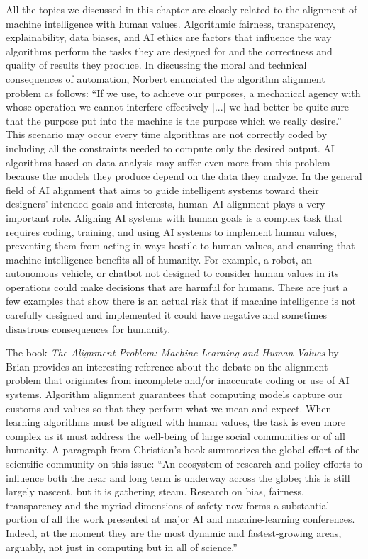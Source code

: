 All the
topics we discussed in this chapter are closely related to the alignment of machine intelligence with human values. Algorithmic fairness, transparency, explainability, data biases, and AI ethics are factors that influence the way algorithms perform the tasks they are designed for and the correctness and quality of results they produce. In discussing the moral and technical consequences of automation, Norbert \citet{chap:7:Wiener:1960} enunciated the algorithm alignment problem as follows: ``If we use, to achieve our purposes, a mechanical agency with whose operation we cannot interfere effectively [...] we had better be quite sure that the purpose put into the machine is the purpose which we really desire.'' This scenario may occur every time algorithms are not correctly coded by including all the constraints needed to compute only the desired output. AI algorithms based on data analysis may suffer even more from this problem because the models they produce depend on the data they analyze. In the general field of AI alignment that aims to guide intelligent systems toward their designers' intended goals and interests, human--AI alignment plays a very important role. Aligning AI systems with human goals is a complex task that requires coding, training, and using AI systems to implement human values, preventing them from acting in ways hostile to human values, and ensuring that machine intelligence benefits all of humanity. For example, a robot, an autonomous vehicle, or chatbot not designed to consider human values in its operations could make decisions that are harmful for humans. These are just a few examples that show there is an actual risk that if machine intelligence is not carefully designed and implemented it could have negative and sometimes disastrous consequences for humanity.

The book \textit{The Alignment Problem: Machine Learning and Human Values} by Brian \citet{chap:7:Christian:2020} provides an interesting reference about the debate on the \hbox{alignment} problem that originates from incomplete and/or inaccurate coding or use of AI systems. Algorithm alignment guarantees that computing models capture our customs and values so that they perform what we mean and expect. When learning algorithms must be aligned with human values, the task is even more complex as it must address the well-being of large social communities or of all humanity. A paragraph from Christian's book summarizes the global effort of the scientific community on this issue: ``An ecosystem of research and policy efforts to influence both the near and long term is underway across the globe; this is still largely nascent, but it is gathering steam. Research on bias, fairness, transparency and the myriad dimensions of safety now forms a substantial portion of all the work presented at major AI and machine-learning conferences. Indeed, at the moment they are the most dynamic and fastest-growing areas, arguably, not just in computing but in all of science.''

